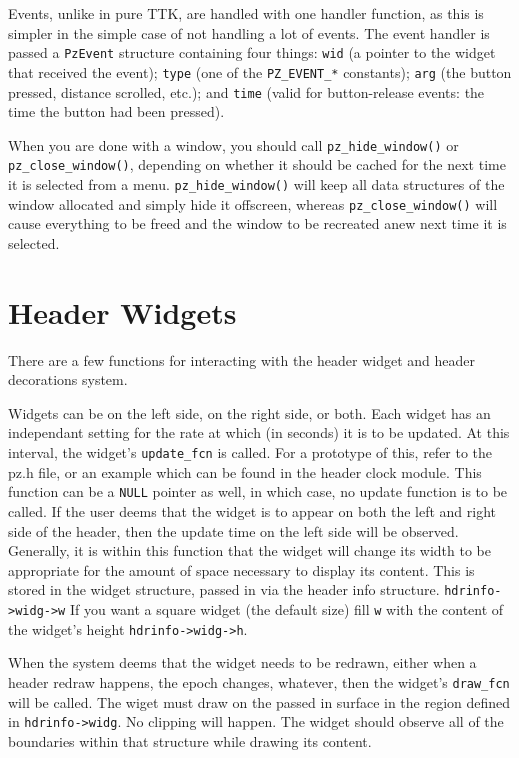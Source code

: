 \documentclass[12pt,letterpaper]{report}
\begin{document}
Events, unlike in pure TTK, are handled with one handler function, as this is simpler in
the simple case of not handling a lot of events. The event handler is passed a \verb|PzEvent|
structure containing four things: \verb|wid| (a pointer to the widget that received the event);
\verb|type| (one of the \verb|PZ_EVENT_*| constants); \verb|arg| (the button pressed, distance
scrolled, etc.); and \verb|time| (valid for button-release events: the time the button had been
pressed).

When you are done with a window, you should call \verb|pz_hide_window()| or \verb|pz_close_window()|,
depending on whether it should be cached for the next time it is selected from a menu.
\verb|pz_hide_window()| will keep all data structures of the window allocated and simply hide
it offscreen, whereas \verb|pz_close_window()| will cause everything to be freed and the window
to be recreated anew next time it is selected.

\section{Header Widgets}

There are a few functions for interacting with the header widget
and header decorations system.

Widgets can be on the left side, on the right side, or both.  Each
widget has an independant setting for the rate at which (in seconds)
it is to be updated.  At this interval, the widget's \verb|update_fcn|
is called.  For a prototype of this, refer to the pz.h file, or an
example which can be found in the header clock module.  This function
can be a \verb|NULL| pointer as well, in which case, no update
function is to be called.  If the user deems that the widget is to
appear on both the left and right side of the header, then the
update time on the left side will be observed.  Generally, it is
within this function that the widget will change its width to be
appropriate for the amount of space necessary to display its content.
This is stored in the widget structure, passed in via the header
info structure.  \verb|hdrinfo->widg->w| If you want a square widget
(the default size) fill \verb|w| with the content of the widget's
height \verb|hdrinfo->widg->h|.

When the system deems that the widget needs to be redrawn, either
when a header redraw happens, the epoch changes, whatever, then the
widget's \verb|draw_fcn| will be called.  The wiget must draw on the 
passed in surface in the region defined in \verb|hdrinfo->widg|.  No
clipping will happen.  The widget should observe all of the boundaries
within that structure while drawing its content.
\end{document}
